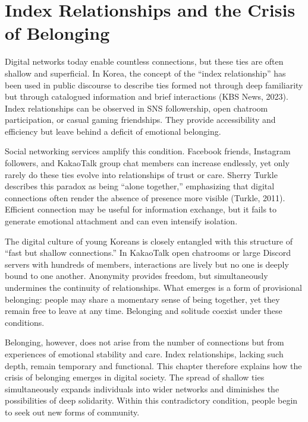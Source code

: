 \chapter{Index Relationships and the Crisis of Belonging}


Digital networks today enable countless connections, but these ties are often shallow and superficial. In Korea, the concept of the “index relationship” has been used in public discourse to describe ties formed not through deep familiarity but through catalogued information and brief interactions (KBS News, 2023). Index relationships can be observed in SNS followership, open chatroom participation, or casual gaming friendships. They provide accessibility and efficiency but leave behind a deficit of emotional belonging.  

Social networking services amplify this condition. Facebook friends, Instagram followers, and KakaoTalk group chat members can increase endlessly, yet only rarely do these ties evolve into relationships of trust or care. Sherry Turkle describes this paradox as being “alone together,” emphasizing that digital connections often render the absence of presence more visible (Turkle, 2011). Efficient connection may be useful for information exchange, but it fails to generate emotional attachment and can even intensify isolation.  

The digital culture of young Koreans is closely entangled with this structure of “fast but shallow connections.” In KakaoTalk open chatrooms or large Discord servers with hundreds of members, interactions are lively but no one is deeply bound to one another. Anonymity provides freedom, but simultaneously undermines the continuity of relationships. What emerges is a form of provisional belonging: people may share a momentary sense of being together, yet they remain free to leave at any time. Belonging and solitude coexist under these conditions.  

Belonging, however, does not arise from the number of connections but from experiences of emotional stability and care. Index relationships, lacking such depth, remain temporary and functional. This chapter therefore explains how the crisis of belonging emerges in digital society. The spread of shallow ties simultaneously expands individuals into wider networks and diminishes the possibilities of deep solidarity. Within this contradictory condition, people begin to seek out new forms of community.  


